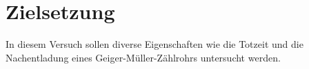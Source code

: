 \section{Zielsetzung}

\label{sec:Zielsetzung}
In diesem Versuch sollen diverse Eigenschaften wie die Totzeit und
die Nachentladung eines Geiger-Müller-Zählrohrs untersucht werden.
